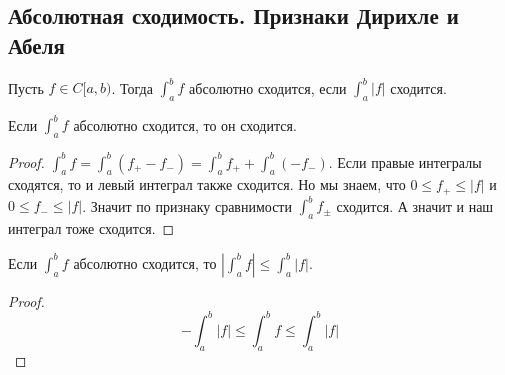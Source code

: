\subsection{Абсолютная сходимость. Признаки Дирихле и Абеля}
\begin{conj}
    Пусть $f \in C[a, b)$. Тогда $\int_{a}^{b} f$ абсолютно сходится, если $\int_{a}^{b} |f|$ сходится.
  \end{conj}
  
  \begin{theorem}
    Если $\int_{a}^{b} f$ абсолютно сходится, то он сходится.
  \end{theorem}
  \begin{proof}
    $\int_{a}^{b} f = \int_{a}^{b}(f_+ - f_-) = \int_{a}^{b} f_+ + \int_{a}^{b} (-f_-)$. Если правые интегралы сходятся, то и левый интеграл также сходится. Но мы знаем, что $0 \leq f_+ \leq |f|$ и $0 \leq f_- \leq |f|$. Значит по признаку сравнимости $\int_{a}^{b} f_{\pm}$ сходится. А значит и наш интеграл тоже сходится.
  \end{proof}
  
  \begin{notice}
    Если $\int_{a}^{b} f$ абсолютно сходится, то $\left | \int_{a}^{b} f \right | \leq \int_{a}^{b} |f|$.
  \end{notice}
  \begin{proof}
    \begin{equation*}
      -\int_{a}^{b} |f| \leq \int_{a}^{b} f \leq \int_{a}^{b} |f|
    \end{equation*}
  \end{proof}
  
